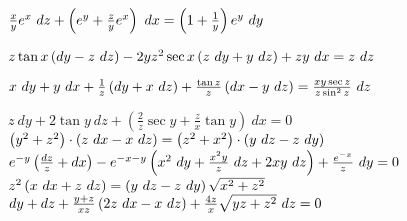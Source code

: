 \begin{enumtasks}
		\label{nonlinsys_pfaff:int_factor_hard}
		\item \( \frac{x}{y} e^{x} ~dz + \left( e^y + \frac{z}{y} e^x \right) ~ dx = \left( 1 + \frac{1}{y} \right) e^y ~ dy \)	 										%
		\item \( z\tan{x} \left( dy - z ~ dz \right) - 2yz^2\sec{x} \left( z ~ dy + y ~ dz \right) + zy ~ dx = z ~dz \) 												%
		\item \( x ~ dy + y ~ dx + \frac{1}{z} \left( dy + x ~ dz \right) + \frac{\tan{z}}{z} \left( dx - y ~ dz \right) = \frac{xy \sec{z}}{z \sin^2{z}} ~ dz \) 		%
		\item \( z ~ dy + 2 \tan{y} ~ dz + \left(\frac{2}{z}\sec{y} + \frac{z}{x} \tan{y}\right) ~ dx = 0 \) 	 											%
		\itemstar \( \left( y^2 + z^2 \right) \cdot \left( z ~ dx - x ~ dz \right) = \left( z^2 + x^2 \right) \cdot \left(  y ~ dz - z ~ dy  \right) \) 									%
		\itemstar \( e^{-y} \left( \frac{dz}{z} + dx \right) - e^{-x-y} \left( x^2 ~ dy + \frac{x^2y}{z} ~ dz + 2xy ~ dz \right) + \frac{e^{-x}}{z} ~ dy = 0 \) 			%
		\itemstar \( z^2 \left( x ~ dx + z ~ dz \right) = \left( y ~ dz - z ~ dy \right) \sqrt{x^2 + z^2} \)																%
		\itemstar \( dy + dz + \frac{y+z}{x z} \left( 2z ~ dx - x ~ dz \right) + \frac{4z}{x} \sqrt{yz + z^2} ~ dz = 0 \)											%

	\end{enumtasks}
